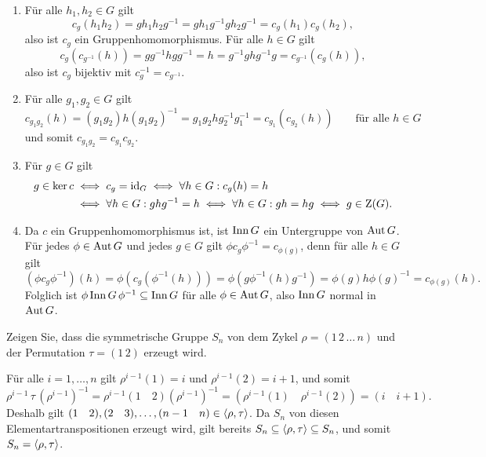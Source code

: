 \begin{solution}
  \begin{enumerate}
    \item
      Für alle $h_1, h_2 \in G$ gilt
      \[
          c_g(h_1 h_2)
        = g h_1 h_2 g^{-1}
        = g h_1 g^{-1} g h_2 g^{-1}
        = c_g(h_1) c_g(h_2),
      \]
      also ist $c_g$ ein Gruppenhomomorphismus.
      Für alle $h \in G$ gilt
      \[
          c_g( c_{g^{-1}}(h) )
        = g g^{-1} h g g^{-1}
        = h
        = g^{-1} g h g^{-1} g
        = c_{g^{-1}}( c_g(h) ),
      \]
      also ist $c_g$ bijektiv mit $c_g^{-1} = c_{g^{-1}}$.
    \item
      Für alle $g_1, g_2 \in G$ gilt
      \[
          c_{g_1 g_2}(h)
        = (g_1 g_2) h (g_1 g_2)^{-1}
        = g_1 g_2 h g_2^{-1} g_1^{-1}
        = c_{g_1}( c_{g_2}(h) )
        \qquad
        \text{für alle $h \in G$}
      \]
      und somit $c_{g_1 g_2} = c_{g_1} c_{g_2}$.
    \item
      Für $g \in G$ gilt
      \begin{align*}
              g \in \ker c
        &\iff c_g = \operatorname{id}_G
         \iff \forall h \in G: c_g(h) = h
        \\
        &\iff \forall h \in G: ghg^{-1} = h
         \iff \forall h \in G: gh = hg
         \iff g \in \operatorname{Z}(G).
      \end{align*}
    \item
      Da $c$ ein Gruppenhomomorphismus ist, ist $\operatorname{Inn} G$ ein Untergruppe von $\operatorname{Aut} G$.
      Für jedes $\phi \in \operatorname{Aut} G$ und jedes $g \in G$ gilt $\phi c_g \phi^{-1} = c_{\phi(g)}$, denn für alle $h \in G$ gilt
      \[
        (\phi c_g \phi^{-1})(h)
        = \phi( c_g( \phi^{-1}(h) ) )
        = \phi(g \phi^{-1}(h) g^{-1})
        = \phi(g) h \phi(g)^{-1}
        = c_{\phi(g)}(h).
      \]
      Folglich ist $\phi \, {\operatorname{Inn} G} \, \phi^{-1} \subseteq \operatorname{Inn} G$ für alle $\phi \in \operatorname{Aut} G$, also $\operatorname{Inn} G$ normal in $\operatorname{Aut} G$.
  \end{enumerate}
\end{solution}


\begin{question}[subtitle = Ein Erzeugendensystem von $S_n$]
  Zeigen Sie, dass die symmetrische Gruppe $S_n$ von dem Zykel $\rho = (1 \, 2 \, \dotso \, n)$ und der Permutation $\tau = (1 \, 2)$ erzeugt wird.
\end{question}


\begin{solution}
  Für alle $i = 1, \dotsc, n$ gilt $\rho^{i-1}(1) = i$ und $\rho^{i-1}(2) = i+1$, und somit
  \[
    \rho^{i-1} \, \tau \, (\rho^{i-1})^{-1}
    = \rho^{i-1} (1 \quad 2) (\rho^{i-1})^{-1}
    = (\rho^{i-1}(1) \quad \rho^{i-1}(2))
    = (i \quad i+1).
  \]
  Deshalb gilt $(1 \quad 2), (2 \quad 3), \dotsc, (n-1 \quad n) \in \langle\rho, \tau\rangle$.
  Da $S_n$ von diesen Elementartranspositionen erzeugt wird, gilt bereits $S_n \subseteq \langle\rho, \tau\rangle \subseteq S_n$, und somit $S_n = \langle\rho, \tau\rangle$.
\end{solution}


